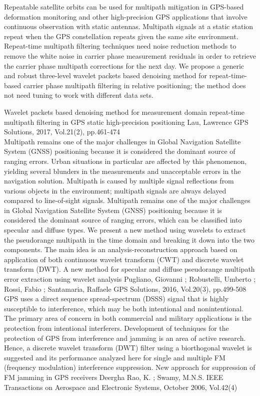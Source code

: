 \documentclass[main.tex]{subfiles}
\begin{document}
Repeatable satellite orbits can be used for multipath mitigation in GPS-based deformation monitoring and other high-precision GPS applications that involve continuous observation with static antennas. Multipath signals at a static station repeat when the GPS constellation repeats given the same site environment. Repeat-time multipath filtering techniques need noise reduction methods to remove the white noise in carrier phase measurement residuals in order to retrieve the carrier phase multipath corrections for the next day. We propose a generic and robust three-level wavelet packets based denoising method for repeat-time-based carrier phase multipath filtering in relative positioning; the method does not need tuning to work with different data sets.

Wavelet packets based denoising method for measurement domain repeat-time multipath filtering in GPS static high-precision positioning
Lau, Lawrence
GPS Solutions, 2017, Vol.21(2), pp.461-474 \\

Multipath remains one of the major challenges in Global Navigation Satellite System (GNSS) positioning because it is considered the dominant source of ranging errors. Urban situations in particular are affected by this phenomenon, yielding several blunders in the measurements and unacceptable errors in the navigation solution. Multipath is caused by multiple signal reflections from various objects in the environment; multipath signals are always delayed compared to line-of-sight signals.
Multipath remains one of the major challenges in Global Navigation Satellite System (GNSS) positioning because it is considered the dominant source of ranging errors, which can be classified into specular and diffuse types. We present a new method using wavelets to extract the pseudorange multipath in the time domain and breaking it down into the two components. The main idea is an analysis-reconstruction approach based on application of both continuous wavelet transform (CWT) and discrete wavelet transform (DWT).
A new method for specular and diffuse pseudorange multipath error extraction using wavelet analysis
Pugliano, Giovanni ; Robustelli, Umberto ; Rossi, Fabio ; Santamaria, Raffaele
GPS Solutions, 2016, Vol.20(3), pp.499-508 \\


GPS uses a direct sequence spread-spectrum (DSSS) signal that is highly susceptible to interference, which may be both intentional and nonintentional. The primary area of concern in both commercial and military applications is the protection from intentional interferers. Development of techniques for the protection of GPS from interference and jamming is an area of active research.
Hence, a discrete wavelet transform (DWT) filter using a biorthogonal wavelet is suggested and its performance analyzed here for single and multiple FM (frequency modulation) interference suppression.
New approach for suppression of FM jamming in GPS receivers
Deergha Rao, K. ; Swamy, M.N.S.
IEEE Transactions on Aerospace and Electronic Systems, October 2006, Vol.42(4)
\end{document}
